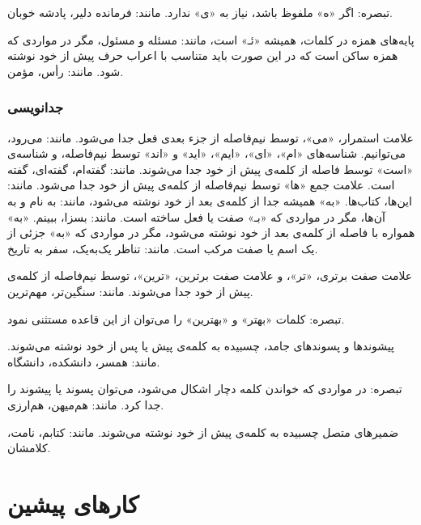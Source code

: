         تبصره‌: اگر «ه» ملفوظ باشد، نیاز به «‌ی» ندارد. مانند: فرمانده دلیر، پادشه خوبان. 

پایه‌های همزه در کلمات، همیشه «ئـ» است، مانند: مسئله و مسئول، مگر در مواردی که همزه ساکن است که در این ‌صورت باید متناسب با اعراب حرف پیش از خود نوشته شود. مانند: رأس، مؤمن. 



\subsubsection{جدانویسی}



علامت استمرار، «می»، توسط نیم‌فاصله از جزء‌ بعدی فعل جدا می‌شود. مانند: می‌رود، می‌توانیم.
شناسه‌های «ام»، «ای»، «ایم»، «اید» و «اند» توسط نیم‌فاصله، و شناسه‌ی «است» توسط فاصله از کلمه‌ی پیش از خود جدا می‌شوند. مانند: گفته‌ام، گفته‌ای، گفته است.
علامت جمع «ها» توسط نیم‌فاصله از کلمه‌ی پیش از خود جدا می‌شود. مانند: این‌ها، کتاب‌ها.
«به» همیشه جدا از کلمه‌ی بعد از خود نوشته می‌شود، مانند: به‌ نام و به آن‌ها، مگر در مواردی که «بـ» صفت یا فعل ساخته است. مانند: بسزا، ببینم.
«به» همواره با فاصله از کلمه‌ی بعد از خود نوشته می‌شود، مگر در مواردی که «به» جزئی از یک اسم یا صفت مرکب است. مانند: تناظر یک‌به‌یک، سفر به تاریخ. 
%
%
%

%

علامت صفت برتری، «تر»، و علامت صفت برترین، «ترین»، توسط نیم‌فاصله از کلمه‌ی پیش از خود جدا می‌شوند. 
مانند: سنگین‌تر، مهم‌ترین.

        تبصره‌: کلمات «بهتر» و «بهترین» را می‌توان از این قاعده مستثنی نمود. 

پیشوندها و پسوندهای جامد، چسبیده به کلمه‌ی پیش یا پس از خود نوشته می‌شوند. مانند: همسر، دانشکده، دانشگاه.

        تبصره‌: در مواردی که خواندن کلمه دچار اشکال می‌شود، می‌توان پسوند یا پیشوند را جدا کرد. مانند: هم‌میهن، هم‌ارزی. 

ضمیرهای متصل چسبیده به کلمه‌ی پیش‌ از خود نوشته می‌شوند. مانند: کتابم، نامت، کلامشان. 





\section{کارهای پیشین}

